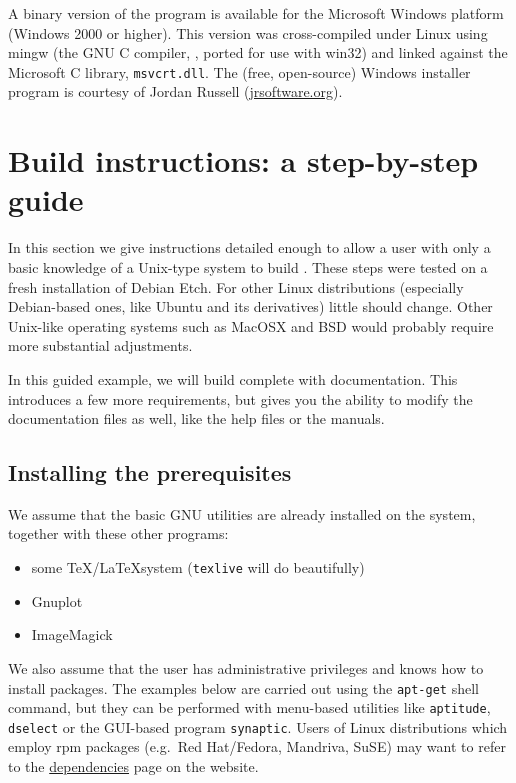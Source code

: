 A binary version of the program is available for the Microsoft Windows
platform (Windows 2000 or higher). This version was cross-compiled
under Linux using mingw (the GNU C compiler, , ported for use
with win32) and linked against the Microsoft C library,
\verb+msvcrt.dll+.  The (free, open-source) Windows installer program
is courtesy of Jordan Russell
(\href{http://www.jrsoftware.org/}{jrsoftware.org}).

\section{Build instructions: a step-by-step guide}
\label{sec:build-inst}

In this section we give instructions detailed enough to allow a user
with only a basic knowledge of a Unix-type system to build .
These steps were tested on a fresh installation of Debian Etch. For
other Linux distributions (especially Debian-based ones, like Ubuntu
and its derivatives) little should change. Other Unix-like operating
systems such as MacOSX and BSD would probably require more substantial
adjustments.

In this guided example, we will build  complete with
documentation.  This introduces a few more requirements, but gives you
the ability to modify the documentation files as well, like the help
files or the manuals.

\subsection{Installing the prerequisites}

We assume that the basic GNU utilities are already installed on the
system, together with these other programs:
\begin{itemize}
\item some \TeX/\LaTeX system (\texttt{texlive} will do beautifully)
\item Gnuplot
\item ImageMagick
\end{itemize}
We also assume that the user has administrative privileges and knows
how to install packages.  The examples below are carried out using the
\texttt{apt-get} shell command, but they can be performed with
menu-based utilities like \texttt{aptitude}, \texttt{dselect} or the
GUI-based program \texttt{synaptic}. Users of Linux distributions
which employ rpm packages (e.g.\ Red Hat/Fedora, Mandriva, SuSE) may
want to refer to the
\href{http://gretl.sourceforge.net/depend.html}{dependencies} page on
the  website.

